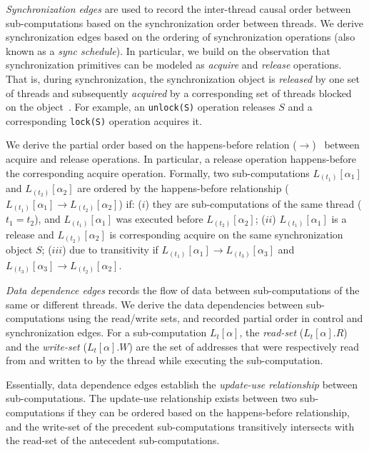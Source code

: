   {\em Synchronization edges}   are
used to record the inter-thread causal order between sub-computations based on the synchronization order between threads. 
We derive synchronization edges based on the ordering of synchronization operations (also known as a {\em sync schedule}). In particular,  we build on the observation that synchronization primitives can be modeled as {\em acquire} and {\em release} operations. That is,   during synchronization, the synchronization object is {\em released} by one set of threads and subsequently  {\em acquired} by a corresponding set of threads blocked on the object~\cite{fast-track-pldi}. For example, an {\tt unlock(S)} operation releases $S$
and a corresponding {\tt lock(S)} operation acquires it.




We derive the partial order based on the happens-before relation
($\rightarrow$)~\cite{djit,fast-track-pldi} between acquire and release operations. In particular, a release
operation happens-before the corresponding acquire operation.
Formally, two sub-computations $L_{(t_1)}[\alpha_1]$ and
$L_{(t_2)}[\alpha_2]$ are ordered by the happens-before relationship ($L_{(t_1)}[\alpha_1] \rightarrow
L_{(t_2)}[\alpha_2]$) if:  ($i$)  they are sub-computations of the
same thread ($t_1 = t_2$), and $L_{(t_1)}[\alpha_1]$ was executed before $L_{(t_2)}[\alpha_2]$; ($ii$)  $L_{(t_1)}[\alpha_1]$  is a release and $L_{(t_2)}[\alpha_2]$ is corresponding acquire on the same synchronization object $S$; ($iii$) due to transitivity if  
 $L_{(t_1)}[\alpha_1] \rightarrow L_{(t_3)}[\alpha_3] $ and $L_{(t_3)}[\alpha_3]  \rightarrow L_{(t_2)}[\alpha_2]$.


  {\em Data dependence edges}  records the flow of data between sub-computations of the same or different threads. 
 We derive the data dependencies between sub-computations using the read/write sets, and recorded partial order in control and synchronization edges. For a sub-computation $L_t[\alpha]$, the {\em read-set}
($L_t[\alpha].R$) and the {\em write-set} ($L_t[\alpha].W$) are the set of
addresses that were respectively read from and written to by
the thread while executing the sub-computation. 

Essentially, data dependence edges establish the {\em update-use relationship} between sub-computations. The update-use relationship exists between two sub-computations if they can be  ordered based on the happens-before relationship, and the write-set of the  precedent  sub-computations transitively intersects with the read-set of the antecedent sub-computations. 




